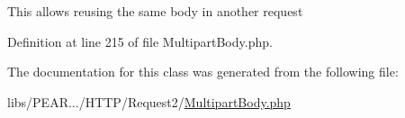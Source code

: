 This allows reusing the same body in another request 

Definition at line 215 of file Multipart\+Body.\+php.



The documentation for this class was generated from the following file\+:\begin{DoxyCompactItemize}
\item 
libs/\+P\+E\+A\+R.../\+H\+T\+T\+P/\+Request2/\hyperlink{MultipartBody_8php}{Multipart\+Body.\+php}\end{DoxyCompactItemize}
